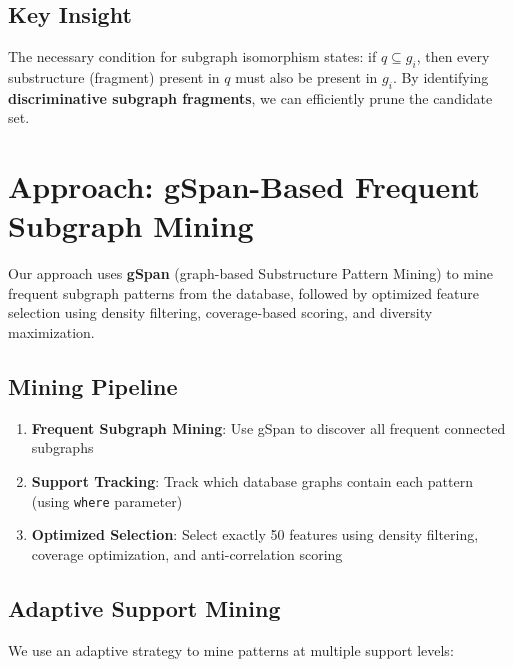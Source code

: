 \documentclass[12pt,a4paper]{article}
\begin{document}
\subsection{Key Insight}

The necessary condition for subgraph isomorphism states: if $q \subseteq g_i$, then every substructure (fragment) present in $q$ must also be present in $g_i$. By identifying \textbf{discriminative subgraph fragments}, we can efficiently prune the candidate set.

\section{Approach: gSpan-Based Frequent Subgraph Mining}

Our approach uses \textbf{gSpan} (graph-based Substructure Pattern Mining) to mine frequent subgraph patterns from the database, followed by optimized feature selection using density filtering, coverage-based scoring, and diversity maximization.

\subsection{Mining Pipeline}

\begin{enumerate}
    \item \textbf{Frequent Subgraph Mining}: Use gSpan to discover all frequent connected subgraphs
    \item \textbf{Support Tracking}: Track which database graphs contain each pattern (using \texttt{where} parameter)
    \item \textbf{Optimized Selection}: Select exactly 50 features using density filtering, coverage optimization, and anti-correlation scoring
\end{enumerate}

\subsection{Adaptive Support Mining}

We use an adaptive strategy to mine patterns at multiple support levels:
\end{document}
